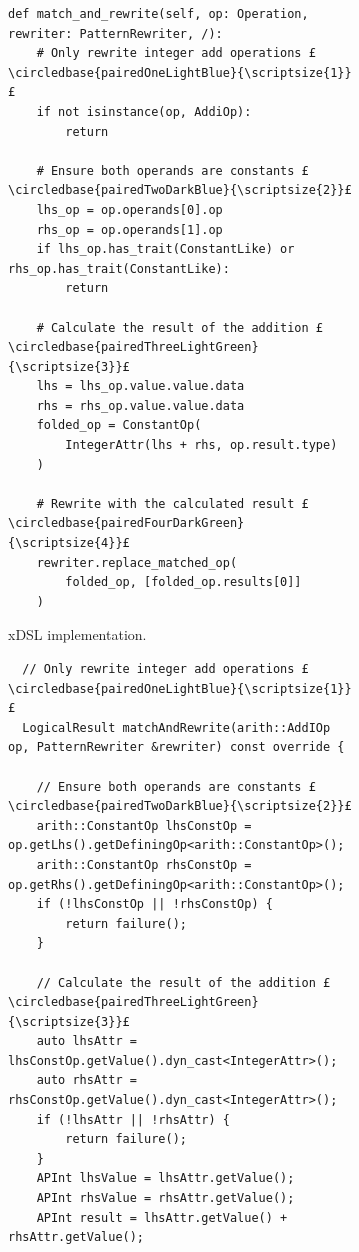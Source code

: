 \begin{figure}[H]
    \centering
    \begin{subfigure}[b]{0.45\textwidth}
       \centering
        \begin{verbatim}
def match_and_rewrite(self, op: Operation, rewriter: PatternRewriter, /):
    # Only rewrite integer add operations £\circledbase{pairedOneLightBlue}{\scriptsize{1}}£
    if not isinstance(op, AddiOp):
        return

    # Ensure both operands are constants £\circledbase{pairedTwoDarkBlue}{\scriptsize{2}}£
    lhs_op = op.operands[0].op
    rhs_op = op.operands[1].op
    if lhs_op.has_trait(ConstantLike) or rhs_op.has_trait(ConstantLike):
        return

    # Calculate the result of the addition £\circledbase{pairedThreeLightGreen}{\scriptsize{3}}£
    lhs = lhs_op.value.value.data
    rhs = rhs_op.value.value.data
    folded_op = ConstantOp(
        IntegerAttr(lhs + rhs, op.result.type)
    )

    # Rewrite with the calculated result £\circledbase{pairedFourDarkGreen}{\scriptsize{4}}£
    rewriter.replace_matched_op(
        folded_op, [folded_op.results[0]]
    )
        \end{verbatim}
        \footnotesize\vspace{5em}
        \captionsetup{name=Listing}
        \caption{xDSL implementation.}
        \label{listing:constant-folding-impl-xdsl}
    \end{subfigure}
    \hfill
    \begin{subfigure}[b]{0.5\textwidth}
        \centering
        \begin{verbatim}
  // Only rewrite integer add operations £\circledbase{pairedOneLightBlue}{\scriptsize{1}}£
  LogicalResult matchAndRewrite(arith::AddIOp op, PatternRewriter &rewriter) const override {

    // Ensure both operands are constants £\circledbase{pairedTwoDarkBlue}{\scriptsize{2}}£
    arith::ConstantOp lhsConstOp = op.getLhs().getDefiningOp<arith::ConstantOp>();
    arith::ConstantOp rhsConstOp = op.getRhs().getDefiningOp<arith::ConstantOp>();
    if (!lhsConstOp || !rhsConstOp) {
        return failure();
    }

    // Calculate the result of the addition £\circledbase{pairedThreeLightGreen}{\scriptsize{3}}£
    auto lhsAttr = lhsConstOp.getValue().dyn_cast<IntegerAttr>();
    auto rhsAttr = rhsConstOp.getValue().dyn_cast<IntegerAttr>();
    if (!lhsAttr || !rhsAttr) {
        return failure();
    }
    APInt lhsValue = lhsAttr.getValue();
    APInt rhsValue = rhsAttr.getValue();
    APInt result = lhsAttr.getValue() + rhsAttr.getValue();


\end{verbatim}
\end{subfigure}
\end{figure}
